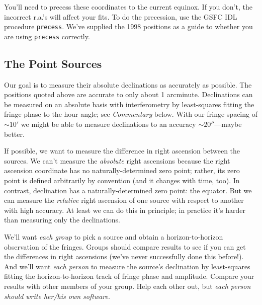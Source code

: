 \documentclass[11pt,preprint]{aastex}
\begin{document}
\noindent You'll need to precess these coordinates to the current
equinox. If you don't, the incorrect r.a.'s will affect your fits. To do
the precession, use the GSFC IDL procedure {\tt precess}. We've supplied the
1998 positions as a guide to whether you are using {\tt precess} correctly.

\subsection{The Point Sources}

	Our goal is to measure their absolute declinations as accurately
as possible.  The positions quoted above are accurate to only about 1
arcminute.  Declinations can be measured on an absolute basis with
interferometry by least-squares fitting the fringe phase to the hour
angle; see {\it Commentary} below.  With our fringe spacing of $\sim
10'$ we might be able to measure declinations to an accuracy $\sim
20''$---maybe better. 

	If possible, we want to measure the difference in right
ascension between the sources.  We can't measure the {\it absolute}
right ascensions because the right ascension coordinate has no
naturally-determined zero point; rather, its zero point is defined
arbitrarily by convention (and it changes with time, too).  In contrast,
declination has a naturally-determined zero point: the equator.  But we
can measure the {\it relative} right ascension of one source with
respect to another with high accuracy.  At least we can do this in
principle; in practice it's harder than measuring only the declinations.

	We'll want {\it each group} to pick a source and obtain a
horizon-to-horizon observation of the fringes. Groups should compare
results to see if you can get the differences in right ascensions (we've
never successfully done this before!). And we'll want {\it each person}
to measure the source's declination by least-squares fitting the
horizon-to-horizon track of fringe phase and amplitude.  Compare your
results with other members of your group.  Help each other out, but {\it
each person should write her/his own software}. 
\end{document}
